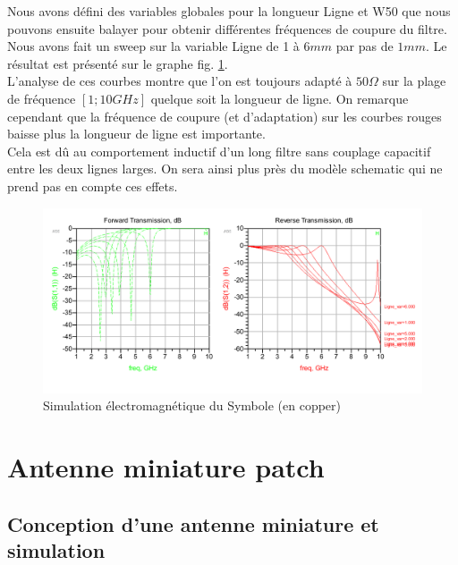 \documentclass[a4paper]{article}
\begin{document}
Nous avons d\'efini des variables globales pour la longueur Ligne et W50 que nous pouvons ensuite balayer pour obtenir
diff\'erentes fr\'equences de coupure du filtre. \\
Nous avons fait un sweep sur la variable Ligne de 1 \`a $6 mm$ par pas de $1 mm$.
Le r\'esultat est pr\'esent\'e sur le graphe fig. \ref{sim_Electromagnetic}.\\

L'analyse de ces courbes montre que l'on est toujours adapt\'e \`a $50 \Omega$  sur la plage de fr\'equence $[1 ; 10 GHz]$ quelque soit la longueur de ligne.
On remarque cependant que la fr\'equence de coupure (et d'adaptation) sur les courbes rouges baisse plus la longueur de ligne est importante.\\

Cela est d\^u au comportement inductif d'un long filtre sans couplage capacitif entre les deux lignes larges. On sera ainsi plus pr\`es du mod\`ele
schematic qui ne prend pas en compte ces effets.\\

\clearpage
\begin{figure}[!htb]
\begin{center}
  \includegraphics[scale=0.45]{Simulation-Finale-Globale-EM.png}
  \caption{Simulation \'electromagn\'etique du Symbole (en copper)}
  \label{sim_Electromagnetic}
\end{center}
\end{figure}

\section{Antenne miniature patch}
\subsection{Conception d'une antenne miniature et simulation}
\end{document}
